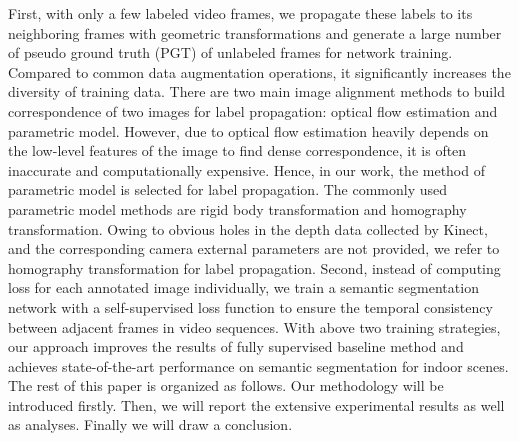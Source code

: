 First, with only a few labeled video frames, we propagate these labels to its neighboring frames with geometric transformations and generate a large number of pseudo ground truth (PGT) of unlabeled frames for network training. 
%
Compared to common data augmentation operations, it significantly increases the diversity of training data.
%
There are two main image alignment methods to build correspondence of two images for label propagation: optical flow estimation and parametric model.
%
However, due to optical flow estimation heavily depends on the low-level features of the image to find dense correspondence, it is often inaccurate and computationally expensive.
%
Hence, in our work, the method of parametric model is selected for label propagation.
%
The commonly used parametric model methods are rigid body transformation and homography transformation.
%
Owing to obvious holes in the depth data collected by Kinect, and the corresponding camera external parameters are not provided,
%
we refer to homography transformation for label propagation.
%
Second, instead of computing loss for each annotated image individually, we train a semantic segmentation network with a self-supervised loss function to ensure the temporal consistency between adjacent frames in video sequences.
%
With above two training strategies, our approach improves the results of fully supervised baseline method and achieves state-of-the-art performance on semantic segmentation for indoor scenes. 
%
The rest of this paper is organized as follows.
% 
Our methodology will be introduced firstly.
%
Then, we will report the extensive experimental results as well as analyses. 
%
Finally we will draw a conclusion.
